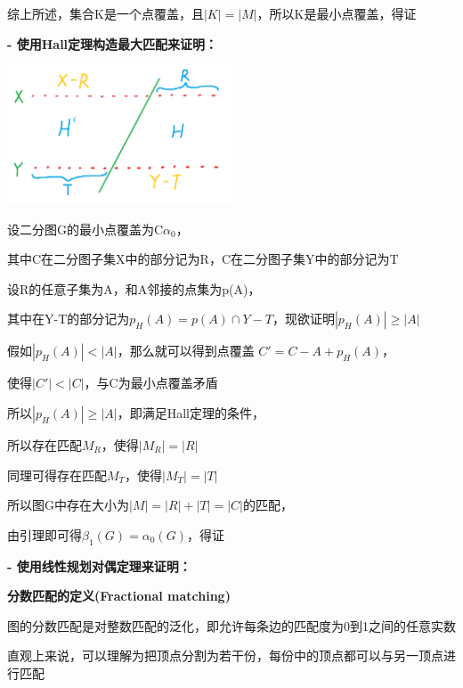 \documentclass[UTF8]{ctexart}
\begin{document}
\begin{enumerate}
            综上所述，集合K是一个点覆盖，且$|K|=|M|$，所以K是最小点覆盖，得证

            \vspace{1cm}



            \textbf{- 使用Hall定理构造最大匹配来证明：}

            \includegraphics[width=0.5\textwidth]{img/proof_Konig_with_Hall.png}

            设二分图G的最小点覆盖为C$\alpha_0$，

            其中C在二分图子集X中的部分记为R，C在二分图子集Y中的部分记为T

            设R的任意子集为A，和A邻接的点集为p(A)，

            其中在Y-T的部分记为$p_H(A)=p(A)\cap Y-T$，现欲证明$|p_H(A)|\ge|A|$

            假如$|p_H(A)|<|A|$，那么就可以得到点覆盖 $C'=C-A+p_H(A)$，

            使得$|C'|<|C|$，与C为最小点覆盖矛盾

            所以$|p_H(A)|\ge|A|$，即满足Hall定理的条件，

            所以存在匹配$M_R$，使得$|M_R|=|R|$

            同理可得存在匹配$M_T$，使得$|M_T|=|T|$

            所以图G中存在大小为$|M|=|R|+|T|=|C|$的匹配，

            由引理即可得$\beta_1(G)=\alpha_0(G)$，得证

            \vspace{1.5cm}


            \textbf{- 使用线性规划对偶定理来证明：}

            \vspace{0.3cm}

            \textbf{分数匹配的定义(Fractional matching)}

            图的分数匹配是对整数匹配的泛化，即允许每条边的匹配度为0到1之间的任意实数

            直观上来说，可以理解为把顶点分割为若干份，每份中的顶点都可以与另一顶点进行匹配


\end{enumerate}
\end{document}
